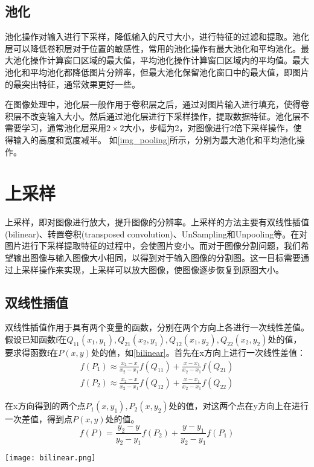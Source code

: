 \documentclass[AutoFakeBold]{LZUThesis}
\begin{document}
\subsection{池化}
池化操作对输入进行下采样，降低输入的尺寸大小，进行特征的过滤和提取。池化层可以降低卷积层对于位置的敏感性，常用的池化操作有最大池化和平均池化。最大池化操作计算窗口区域的最大值，平均池化操作计算窗口区域内的平均值。最大池化和平均池化都降低图片分辨率，但最大池化保留池化窗口中的最大值，即图片的最突出特征，通常效果更好一些。

在图像处理中，池化层一般作用于卷积层之后，通过对图片输入进行填充，使得卷积层不改变输入大小。然后通过池化层进行下采样操作，提取数据特征。池化层不需要学习，通常池化层采用$2\times 2$大小，步幅为2，对图像进行2倍下采样操作，使得输入的高度和宽度减半。
如\cref{img_pooling}所示，分别为最大池化和平均池化操作。





\section{上采样}
上采样，即对图像进行放大，提升图像的分辨率。上采样的方法主要有双线性插值(bilinear)、转置卷积(transposed convolution)、UnSampling和Unpooling\textsuperscript{\cite{zeiler2014visualizing, noh2015learning}}等。在对图片进行下采样提取特征的过程中，会使图片变小。而对于图像分割问题，我们希望输出图像与输入图像大小相同，以得到对于输入图像的分割图。这一目标需要通过上采样操作来实现，上采样可以放大图像，使图像逐步恢复到原图大小。

\subsection{双线性插值}
双线性插值作用于具有两个变量的函数，分别在两个方向上各进行一次线性差值。假设已知$\mbox{函数f在}Q_{11}(x_1,y_1), Q_{21}(x_2,y_1), Q_{12}(x_1,y_2), Q_{22}(x_2,y_2)$处的值，要求得$\mbox{函数f在}P(x,y)$处的值，如\cref{bilinear}。首先在x方向上进行一次线性差值：
\begin{equation}
    \begin{split}
        f(P_1)\approx \frac{x_2-x}{x_2-x_1}f(Q_{11})+\frac{x-x_1}{x_2-x_1}f(Q_{21})\\
        f(P_2)\approx \frac{x_2-x}{x_2-x_1}f(Q_{12})+\frac{x-x_1}{x_2-x_1}f(Q_{22})
    \end{split}
\end{equation}

在x方向得到的两个点$P_1(x,y_1), P_2(x,y_2)$处的值，对这两个点在y方向上在进行一次差值，得到点$P(x,y)$处的值。
\begin{equation}
    f(P)=\frac{y_2-y}{y_2-y_1}f(P_2)+\frac{y-y_1}{y_2-y_1}f(P_1)
\end{equation}
\begin{figure*}[htbp]
    \centering
    \texttt{[image: bilinear.png]}
    \caption{双线性插值}
    \label{bilinear}
\end{figure*}
\end{document}
